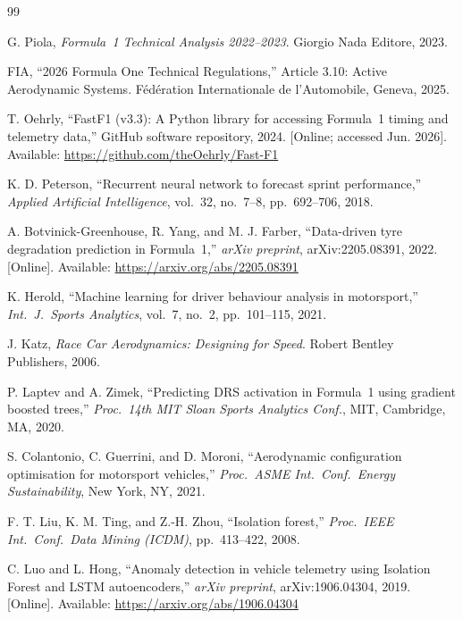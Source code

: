 \documentclass[conference,a4paper]{IEEEtran}
\begin{document}
\balance
\begin{thebibliography}{99}

G. Piola, \textit{Formula~1 Technical Analysis 2022--2023}.
Giorgio Nada Editore, 2023.

FIA, ``2026 Formula One Technical Regulations,''
Article 3.10: Active Aerodynamic Systems.
Fédération Internationale de l'Automobile, Geneva, 2025.

T. Oehrly, ``FastF1 (v3.3): A Python library for accessing Formula~1 timing and telemetry data,''
GitHub software repository, 2024. [Online; accessed Jun. 2026]. Available: \url{https://github.com/theOehrly/Fast-F1}

K. D. Peterson, ``Recurrent neural network to forecast sprint performance,''
\textit{Applied Artificial Intelligence}, vol.~32, no.~7--8, pp.~692--706, 2018.

A. Botvinick-Greenhouse, R. Yang, and M. J. Farber,
``Data-driven tyre degradation prediction in Formula~1,''
\textit{arXiv preprint}, arXiv:2205.08391, 2022. [Online]. Available:
\url{https://arxiv.org/abs/2205.08391}

K. Herold, ``Machine learning for driver behaviour analysis in motorsport,''
\textit{Int.\ J.\ Sports Analytics}, vol.~7, no.~2, pp.~101--115, 2021.

J. Katz, \textit{Race Car Aerodynamics: Designing for Speed}.
Robert Bentley Publishers, 2006.

P. Laptev and A. Zimek,
``Predicting DRS activation in Formula~1 using gradient boosted trees,''
\textit{Proc.\ 14th MIT Sloan Sports Analytics Conf.}, MIT, Cambridge, MA, 2020.

S. Colantonio, C. Guerrini, and D. Moroni,
``Aerodynamic configuration optimisation for motorsport vehicles,''
\textit{Proc.\ ASME Int.\ Conf.\ Energy Sustainability}, New York, NY, 2021.

F. T. Liu, K. M. Ting, and Z.-H. Zhou,
``Isolation forest,''
\textit{Proc.\ IEEE Int.\ Conf.\ Data Mining (ICDM)}, pp.~413--422, 2008.

C. Luo and L. Hong,
``Anomaly detection in vehicle telemetry using Isolation Forest and LSTM autoencoders,''
\textit{arXiv preprint}, arXiv:1906.04304, 2019. [Online]. Available:
\url{https://arxiv.org/abs/1906.04304}


\end{thebibliography}
\end{document}
